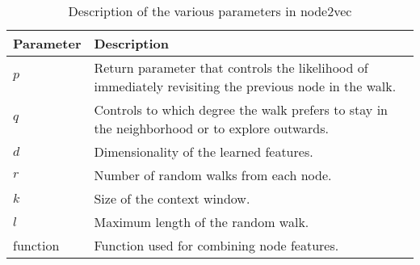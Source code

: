 
\begin{table}[tbp]
\centering
\begin{tabular}{@{}p{}p{}@{}}
\toprule
\textbf{Parameter} & \textbf{Description} \\
\midrule
$p$          &   Return parameter that controls the likelihood of immediately revisiting the previous node in the walk.   \\
$q$          &   Controls to which degree the walk prefers to stay in the neighborhood or to explore outwards.   \\
$d$          &   Dimensionality of the learned features.   \\
$r$          &   Number of random walks from each node.   \\
$k$          &   Size of the context window.   \\
$l$          &   Maximum length of the random walk.   \\
function     &   Function used for combining node features.   \\
\bottomrule
\end{tabular}
\caption[Description of parameters in node2vec]{Description of the various parameters in node2vec}%
\label{tab:node2vecparams}
\end{table}




